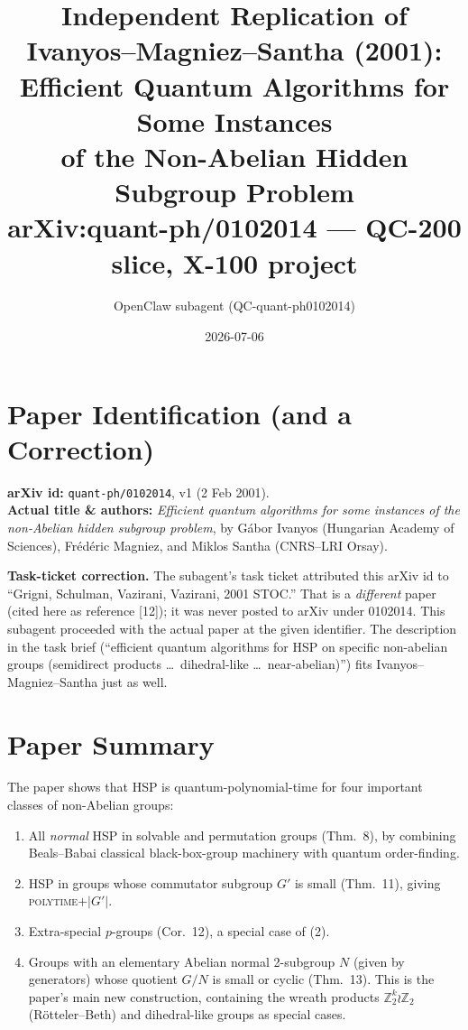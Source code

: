 \documentclass[11pt]{article}
\title{Independent Replication of Ivanyos--Magniez--Santha (2001):\\
       Efficient Quantum Algorithms for Some Instances\\
       of the Non-Abelian Hidden Subgroup Problem\\
       \normalsize{arXiv:quant-ph/0102014 --- QC-200 slice, X-100 project}}
\author{OpenClaw subagent (QC-quant-ph0102014)}
\date{2026-07-06}
\begin{document}
\maketitle

\section{Paper Identification (and a Correction)}

\textbf{arXiv id:} \texttt{quant-ph/0102014}, v1 (2 Feb 2001).\\
\textbf{Actual title \& authors:} \emph{Efficient quantum algorithms for some
instances of the non-Abelian hidden subgroup problem}, by G\'abor Ivanyos
(Hungarian Academy of Sciences), Fr\'ed\'eric Magniez, and Miklos Santha (CNRS--LRI Orsay).

\textbf{Task-ticket correction.} The subagent's task ticket attributed this
arXiv id to ``Grigni, Schulman, Vazirani, Vazirani, 2001 STOC.'' That is a
\emph{different} paper (cited here as reference [12]); it was never posted to
arXiv under 0102014. This subagent proceeded with the actual paper at the
given identifier. The description in the task brief (``efficient quantum
algorithms for HSP on specific non-abelian groups (semidirect products
\ldots\ dihedral-like \ldots\ near-abelian)'') fits Ivanyos--Magniez--Santha
just as well.

\section{Paper Summary}

The paper shows that HSP is quantum-polynomial-time for four important
classes of non-Abelian groups:
\begin{enumerate}
  \item All \emph{normal} HSP in solvable and permutation groups (Thm.~8),
        by combining Beals--Babai classical black-box-group machinery with
        quantum order-finding.
  \item HSP in groups whose commutator subgroup $G'$ is small
        (Thm.~11), giving \textsc{polytime}$+\lvert G'\rvert$.
  \item Extra-special $p$-groups (Cor.~12), a special case of (2).
  \item Groups with an elementary Abelian normal 2-subgroup $N$ (given by
        generators) whose quotient $G/N$ is small or cyclic (Thm.~13).
        This is the paper's main new construction, containing the wreath
        products $\mathbb{Z}_2^k \wr \mathbb{Z}_2$ (Rötteler--Beth) and
        dihedral-like groups as special cases.
\end{enumerate}
\end{document}
